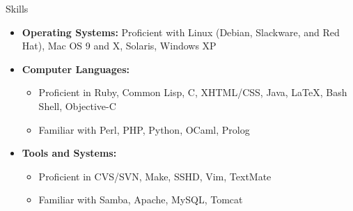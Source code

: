 \documentclass[11pt,oneside]{article}
\newenvironment{ressection}[1]{
	\vspace{4pt}
	{\fontfamily{phv}\selectfont\Large#1}
	\begin{itemize}
	\vspace{3pt}
}{
	\end{itemize}
}
\newcommand{\resitem}[1]{
	\vspace{-4pt}
	\item \begin{flushleft} #1 \end{flushleft}
}
\newcommand{\ressubitem}[1]{
	\vspace{-1pt}
	\item \begin{flushleft} #1 \end{flushleft}
}
\newenvironment{reslist}[1]{
	\resitem{\textbf{#1}}
	\vspace{-5pt}
	\begin{itemize}
}{
	\end{itemize}
}
\begin{document}
\begin{ressection}{Skills}

	\resitem{\textbf{Operating Systems:} Proficient with Linux (Debian, Slackware, and Red Hat), Mac OS 9 and X, Solaris, Windows XP}

	\begin{reslist}{Computer Languages:}

		\ressubitem{Proficient in Ruby, Common Lisp, C, XHTML/CSS, Java, \LaTeX, Bash Shell, Objective-C}

		\ressubitem{Familiar with Perl, PHP, Python, OCaml, Prolog}

	\end{reslist}

	\begin{reslist}{Tools and Systems:}

		\ressubitem{Proficient in CVS/SVN, Make, SSHD, Vim, TextMate}

		\ressubitem{Familiar with Samba, Apache, MySQL, Tomcat}

	\end{reslist}
	

\end{ressection}
\end{document}
